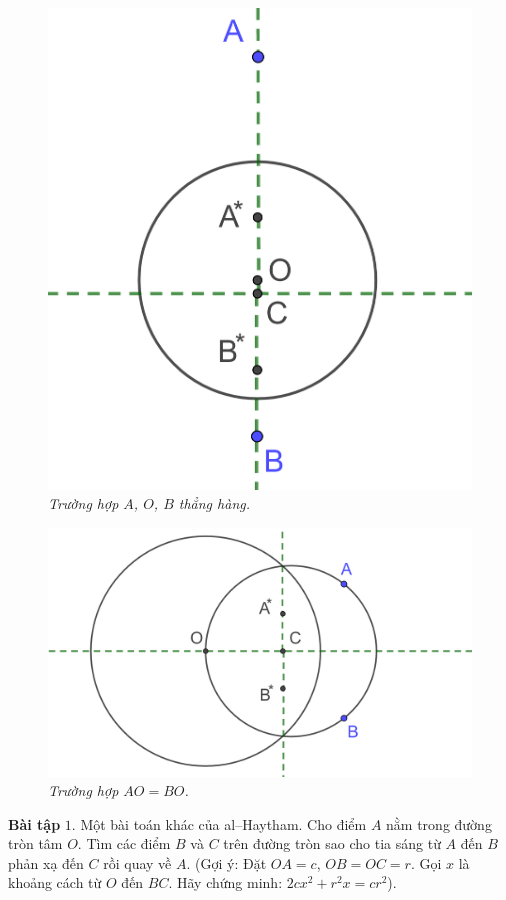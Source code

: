 \begin{multicols}{2}
\begin{figure}[H]
		\includegraphics[width= 0.75\linewidth]{16}
		\caption{\small\textit{\color{lichsutoanhoc}Trường hợp $A$, $O$, $B$ thẳng hàng.}}
		\vspace*{-10pt}
	\end{figure}
	\begin{figure}[H]
		\vspace*{-5pt}
		\centering
		\captionsetup{labelformat= empty, justification=centering}
		\includegraphics[width= 1\linewidth]{17}
		\caption{\small\textit{\color{lichsutoanhoc}Trường hợp $AO = BO$.}}
		\vspace*{-10pt}
	\end{figure}
	\textbf{\color{lichsutoanhoc}Bài tập}
	\vskip 0.1cm
	$1.$ Một bài toán khác của al--Haytham. Cho điểm $A$ nằm trong đường tròn tâm $O$. Tìm các điểm $B$ và $C$ trên đường tròn sao cho tia sáng từ $A$ đến $B$ phản xạ đến $C$ rồi quay về $A$. (Gợi ý: Đặt $OA = c$, $OB = OC = r$. Gọi $x$ là khoảng cách từ $O$ đến $BC$. Hãy chứng minh: $2cx^2+r^2x=cr^2$).

\end{multicols}
